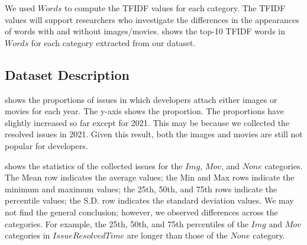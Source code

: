 We used $Words$ to compute the TFIDF values for each category. 
The TFIDF values will support researchers who investigate 
the differences in the appearances of words with and without 
images/movies. 
 shows the top-10 TFIDF words in $Words$ 
for each category extracted from our dataset. 

\subsection{Dataset Description}



 shows the proportions of 
issues in which developers attach either 
images or movies for each year. 
The y-axis shows the proportion. 
The proportions have slightly increased so far 
except for 2021. 
This may be because we collected the resolved issues 
in 2021. 
Given this result, both the images and movies are still 
not popular for developers. 




 shows the statistics
of the collected issues for the $Img$, $Mov$,
and $None$ categories.
The Mean row indicates the average values; 
the Min and Max rows indicate the minimum and maximum values; 
the 25th, 50th, and 75th rows indicate the percentile values; 
the S.D. row indicates the standard deviation values. 
We may not find the general conclusion; 
however, we observed differences across the categories. 
For example, the 25th, 50th, and 75th percentiles of 
the $Img$ and $Mov$ categories in $IssueResolvedTime$ are 
longer than those of the $None$ category. 
